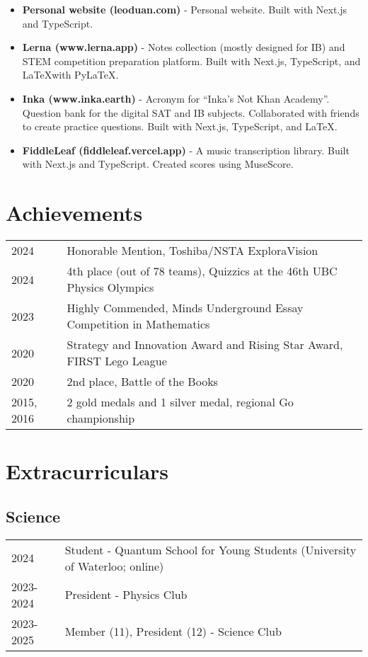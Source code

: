 \documentclass{article}
\begin{document}
\begin{itemize}
	\item \textbf{Personal website (leoduan.com)} - Personal website. Built with Next.js and TypeScript.
	\item \textbf{Lerna (www.lerna.app)} - Notes collection (mostly designed for IB) and STEM competition preparation platform. Built with Next.js, TypeScript, and \LaTeX with PyLaTeX.
	\item \textbf{Inka (www.inka.earth)} - Acronym for ``Inka's Not Khan Academy''. Question bank for the digital SAT and IB subjects. Collaborated with friends to create practice questions. Built with Next.js, TypeScript, and \LaTeX.
	\item \textbf{FiddleLeaf (fiddleleaf.vercel.app)} - A music transcription library. Built with Next.js and TypeScript. Created scores using MuseScore.
\end{itemize}

\section*{Achievements}

\begin{tabular}{@{}ll}
	2024       & Honorable Mention, Toshiba/NSTA ExploraVision                          \\
	2024       & 4th place (out of 78 teams), Quizzics at the 46th UBC Physics Olympics \\
	2023       & Highly Commended, Minds Underground Essay Competition in Mathematics   \\
	2020       & Strategy and Innovation Award and Rising Star Award, FIRST Lego League \\
	2020       & 2nd place, Battle of the Books                                         \\
	2015, 2016 & 2 gold medals and 1 silver medal, regional Go championship
\end{tabular}

\section*{Extracurriculars}

\subsection*{Science}

\begin{tabular}{@{}ll}
	2024      & Student - Quantum School for Young Students (University of Waterloo; online) \\
	2023-2024 & President - Physics Club                                                     \\
	2023-2025 & Member (11), President (12) - Science Club
\end{tabular}
\end{document}
